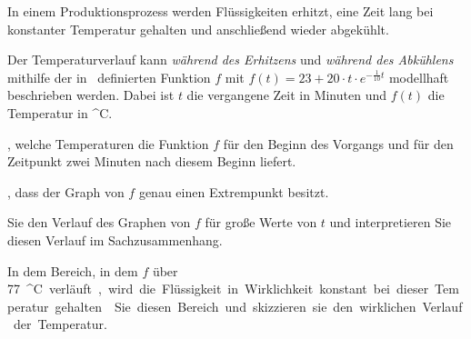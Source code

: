 \documentclass[11pt, a5paper, landscape, final]{scrartcl}
\begin{document}
	\begin{aufgabe}
		In einem Produktionsprozess werden Flüssigkeiten erhitzt, eine Zeit lang bei konstanter Temperatur gehalten und anschließend wieder abgekühlt.
		
		Der Temperaturverlauf kann \emph{während des Erhitzens} und \emph{während des Abkühlens} mithilfe der in \R\ definierten Funktion $f$ mit $f(t) = 23 + 20\cdot t\cdot e^{-\tfrac{1}{10}t}$ modellhaft beschrieben werden. Dabei ist $t$ die vergangene Zeit in Minuten und $f(t)$ die Temperatur in \si{^\circ C}.
		
		\begin{enumeratea}
			\item {}, welche Temperaturen die Funktion $f$ für den Beginn des Vorgangs und für den Zeitpunkt zwei Minuten nach diesem Beginn liefert.
			\item {}, dass der Graph von $f$ genau einen Extrempunkt besitzt.
			\item {}  Sie den Verlauf des Graphen von $f$ für große Werte von $t$ und interpretieren Sie diesen Verlauf im Sachzusammenhang.
			\item In dem Bereich, in dem $f$ über \SI{77}{^\circ C} verläuft, wird die Flüssigkeit in Wirklichkeit konstant bei dieser Temperatur gehalten.
			
			 Sie diesen Bereich und skizzieren sie den wirklichen Verlauf der Temperatur.
		\end{enumeratea}
	\end{aufgabe}
	\clearpage
	
\end{document}

